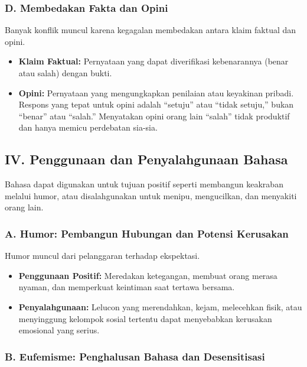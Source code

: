 \documentclass[
  letterpaper,
  DIV=11,
  numbers=noendperiod]{scrreprt}
\begin{document}
\subsubsection{D. Membedakan Fakta dan
Opini}\label{d.-membedakan-fakta-dan-opini}

Banyak konflik muncul karena kegagalan membedakan antara klaim faktual
dan opini.

\begin{itemize}
\item
  \textbf{Klaim Faktual:} Pernyataan yang dapat diverifikasi
  kebenarannya (benar atau salah) dengan bukti.
\item
  \textbf{Opini:} Pernyataan yang mengungkapkan penilaian atau keyakinan
  pribadi. Respons yang tepat untuk opini adalah ``setuju'' atau ``tidak
  setuju,'' bukan ``benar'' atau ``salah.'' Menyatakan opini orang lain
  ``salah'' tidak produktif dan hanya memicu perdebatan sia-sia.
\end{itemize}

\subsection{IV. Penggunaan dan Penyalahgunaan
Bahasa}\label{iv.-penggunaan-dan-penyalahgunaan-bahasa}

Bahasa dapat digunakan untuk tujuan positif seperti membangun keakraban
melalui humor, atau disalahgunakan untuk menipu, mengucilkan, dan
menyakiti orang lain.

\subsubsection{A. Humor: Pembangun Hubungan dan Potensi
Kerusakan}\label{a.-humor-pembangun-hubungan-dan-potensi-kerusakan}

Humor muncul dari pelanggaran terhadap ekspektasi.

\begin{itemize}
\item
  \textbf{Penggunaan Positif:} Meredakan ketegangan, membuat orang
  merasa nyaman, dan memperkuat keintiman saat tertawa bersama.
\item
  \textbf{Penyalahgunaan:} Lelucon yang merendahkan, kejam, melecehkan
  fisik, atau menyinggung kelompok sosial tertentu dapat menyebabkan
  kerusakan emosional yang serius.
\end{itemize}

\subsubsection{B. Eufemisme: Penghalusan Bahasa dan
Desensitisasi}\label{b.-eufemisme-penghalusan-bahasa-dan-desensitisasi}
\end{document}

